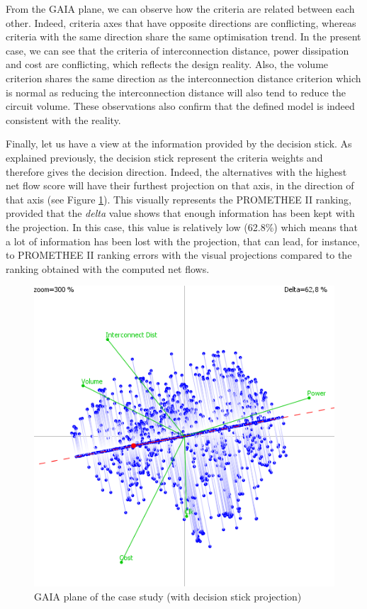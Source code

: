 From the GAIA plane, we can observe how the criteria are related between each other. Indeed, criteria axes that have opposite directions are conflicting, whereas criteria with the same direction share the same optimisation trend. In the present case, we can see that the criteria of interconnection distance, power dissipation and cost are conflicting, which reflects the design reality. Also, the volume criterion shares the same direction as the interconnection distance criterion which is normal as reducing the interconnection distance will also tend to reduce the circuit volume. These observations also confirm that the defined model is indeed consistent with the reality.

Finally, let us have a view at the information provided by the decision stick. As explained previously, the decision stick represent the criteria weights and therefore gives the decision direction. Indeed, the alternatives with the highest net flow score will have their furthest projection on that axis, in the direction of that axis (see Figure \ref{fig:gva804stick}). This visually represents the PROMETHEE II ranking,  provided that the \textit{delta} value shows that enough information has been kept with the projection. In this case, this value is relatively low (62.8\%) which means that a lot of information has been lost with the projection, that can lead, for instance, to PROMETHEE II ranking errors with the visual projections compared to the ranking obtained with the computed net flows.

\begin{figure}[h!]
\begin{center}
\includegraphics[width=0.8\linewidth]{gva804stick}
\end{center}
\caption{GAIA plane of the case study (with decision stick projection)}
\label{fig:gva804stick}
\end{figure}

